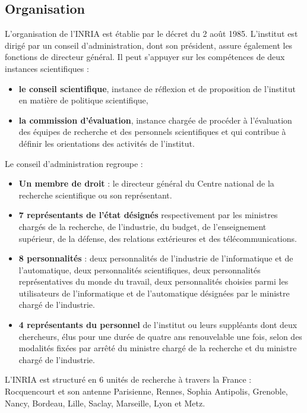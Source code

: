 \documentclass[a4paper, 11pt]{report}
\begin{document}
    \subsection{Organisation}
    L'organisation de l'INRIA est établie par le décret du 2 août 1985.
    L'institut est dirigé par un conseil d'administration, dont son
    président, assure également les fonctions de directeur général.
    Il peut s'appuyer sur les compétences de deux instances scientifiques :
    \begin{itemize}
      \item \textbf{le conseil scientifique}, instance de réflexion et de
      proposition de l'institut en matière de politique scientifique,
      \item \textbf{la commission d’évaluation}, instance chargée de procéder à
      l'évaluation des équipes de recherche et des personnels scientifiques
      et qui contribue à définir les orientations des activités de l'institut.
    \end{itemize}

    Le conseil d'administration regroupe :
    \begin{itemize}
      \item \textbf{Un membre de droit} : le directeur général du Centre national de
        la recherche scientifique ou son représentant.
      \item \textbf{7 représentants de l'état désignés} respectivement par les
        ministres chargés de la recherche, de l'industrie, du budget, de
        l'enseignement supérieur, de la défense, des relations extérieures et
        des télécommunications.
      \item \textbf{8 personnalités} : deux personnalités de l'industrie de
        l'informatique et de l'automatique, deux personnalités scientifiques,
        deux personnalités représentatives du monde du travail, deux
        personnalités choisies parmi les utilisateurs de l'informatique et de
        l'automatique désignées par le ministre chargé de l'industrie.
      \item \textbf{4 représentants du personnel} de l'institut ou leurs
        suppléants dont deux chercheurs, élus pour une durée de quatre ans
        renouvelable une fois, selon des modalités fixées par arrêté du
        ministre chargé de la recherche et du ministre chargé de l'industrie.
    \end{itemize}

    L'INRIA est structuré en 6 unités de recherche à travers la France :
    Rocquencourt et son antenne Parisienne, Rennes, Sophia Antipolis, Grenoble,
    Nancy, Bordeau, Lille, Saclay, Marseille, Lyon et Metz. \\
\end{document}
